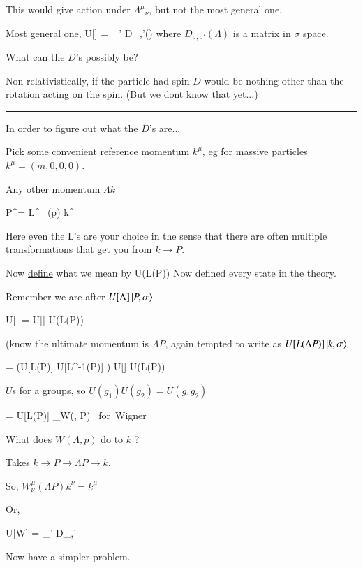 {This would give action under ${\Lambda^\mu}_\nu$, but not the most general one.

Most general one,
\be
U[\Lambda]  = \sum_{\sigma'} D_{\sigma,\sigma'}(\Lambda) 
\ee
where $D_{\sigma,\sigma'}(\Lambda)$ is a matrix in $\sigma$ space.

What can the $D$'s possibly be?

Non-relativistically, if the particle had spin $D$ would be nothing other than the rotation acting on the spin. (But we dont know that yet...)

\noindent\rule{\textwidth}{1pt}

In order to figure out what the $D$'s are...

Pick some convenient reference momentum $k^\mu$,  eg for massive particles $k^\mu = (m,0,0,0)$.

Any other momentum $\Lambda k$

\be
P^\mu = L^\mu_\nu(p) k^\nu
\ee

Here even the L's are your choice in the sense that there are often multiple transformations that get you from $k \rightarrow P$.

Now \underline{define} what we mean by 
\be
{} \equiv U(L(P)) 
\ee
Now defined every state in the theory.

Remember we are after $U[\Lambda] \ket{P, \sigma}$

\be
U[\Lambda]  = U[\Lambda] U(L(P)) 
\ee

(know the ultimate momentum is $\Lambda P$, again tempted to write as $U[L(\Lambda P)] \ket{k, \sigma}$


\be
 = \left(U[L(\Lambda P)] U[L^{-1}(\Lambda P)] \right) U[\Lambda] U(L(P)) 
\ee

$U$s for a groups, so $U(g_1)U(g_2) = U(g_1g_2)$

\be
 = U[L(\Lambda P)] _{W(\Lambda, P) \mbox{ for Wigner}} 
\ee

What does $W(\Lambda,p)$ do to $k$ ?

Takes $k\rightarrow P \rightarrow \Lambda P \rightarrow k$.

So, $W^\mu_\nu(\Lambda P) k^\nu = k^\mu$

Or,

\be
U[W]  = \sum_{\sigma'} D_{\sigma,\sigma'}
\ee

Now have a simpler problem.

}

